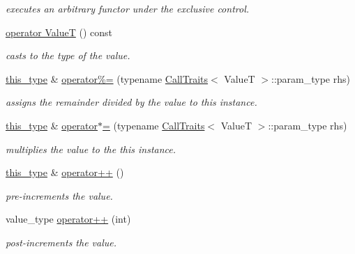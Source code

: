 \begin{DoxyCompactItemize}
\begin{DoxyCompactList}\small\item\em executes an arbitrary functor under the exclusive control. \end{DoxyCompactList}\item 
\hyperlink{group__exclusion__control_ga3893c9d48406bce7b4b07cc0e4b7d20b}{operator Value\-T} () const 
\begin{DoxyCompactList}\small\item\em casts to the type of the value. \end{DoxyCompactList}\item 
\hyperlink{classhryky_1_1exclusion_1_1_atomic_writing_afc6301af19df5cf042e0cbed6d273b2a}{this\-\_\-type} \& \hyperlink{group__exclusion__control_ga5c08a4d5bb6ceea2b2f91f9786a9945f}{operator\%=} (typename \hyperlink{classhryky_1_1_call_traits}{Call\-Traits}$<$ Value\-T $>$\-::param\-\_\-type rhs)
\begin{DoxyCompactList}\small\item\em assigns the remainder divided by the value to this instance. \end{DoxyCompactList}\item 
\hyperlink{classhryky_1_1exclusion_1_1_atomic_writing_afc6301af19df5cf042e0cbed6d273b2a}{this\-\_\-type} \& \hyperlink{group__exclusion__control_ga6d7035d7bdfa0baa65e1e5580a617b34}{operator$\ast$=} (typename \hyperlink{classhryky_1_1_call_traits}{Call\-Traits}$<$ Value\-T $>$\-::param\-\_\-type rhs)
\begin{DoxyCompactList}\small\item\em multiplies the value to the this instance. \end{DoxyCompactList}\item 
\hyperlink{classhryky_1_1exclusion_1_1_atomic_writing_afc6301af19df5cf042e0cbed6d273b2a}{this\-\_\-type} \& \hyperlink{group__exclusion__control_gaa75c713c9c844df689e0ef44d9cf074e}{operator++} ()
\begin{DoxyCompactList}\small\item\em pre-\/increments the value. \end{DoxyCompactList}\item 
value\-\_\-type \hyperlink{group__exclusion__control_ga6c7259992061b671eb6659fb2ce28f9c}{operator++} (int)
\begin{DoxyCompactList}\small\item\em post-\/increments the value. \end{DoxyCompactList}\item 

\end{DoxyCompactItemize}
